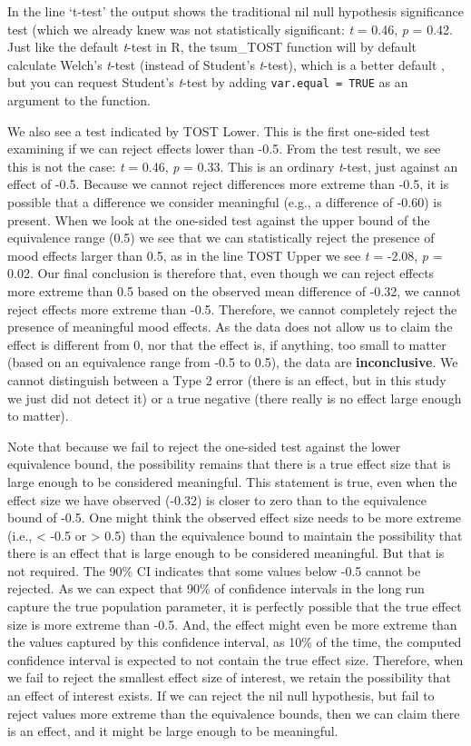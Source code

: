 \documentclass[
  oneside]{krantz}
\begin{document}
In the line `t-test' the output shows the traditional nil null hypothesis significance test (which we already knew was not statistically significant: \emph{t} = 0.46, \emph{p} = 0.42. Just like the default \emph{t}-test in R, the tsum\_TOST function will by default calculate Welch's \emph{t}-test (instead of Student's \emph{t}-test), which is a better default \citep{delacre_why_2017}, but you can request Student's \emph{t}-test by adding \texttt{var.equal\ =\ TRUE} as an argument to the function.

We also see a test indicated by TOST Lower. This is the first one-sided test examining if we can reject effects lower than -0.5. From the test result, we see this is not the case: \emph{t} = 0.46, \emph{p} = 0.33. This is an ordinary \emph{t}-test, just against an effect of -0.5. Because we cannot reject differences more extreme than -0.5, it is possible that a difference we consider meaningful (e.g., a difference of -0.60) is present. When we look at the one-sided test against the upper bound of the equivalence range (0.5) we see that we can statistically reject the presence of mood effects larger than 0.5, as in the line TOST Upper we see \emph{t} = -2.08, \emph{p} = 0.02. Our final conclusion is therefore that, even though we can reject effects more extreme than 0.5 based on the observed mean difference of -0.32, we cannot reject effects more extreme than -0.5. Therefore, we cannot completely reject the presence of meaningful mood effects. As the data does not allow us to claim the effect is different from 0, nor that the effect is, if anything, too small to matter (based on an equivalence range from -0.5 to 0.5), the data are \textbf{inconclusive}. We cannot distinguish between a Type 2 error (there is an effect, but in this study we just did not detect it) or a true negative (there really is no effect large enough to matter).

Note that because we fail to reject the one-sided test against the lower equivalence bound, the possibility remains that there is a true effect size that is large enough to be considered meaningful. This statement is true, even when the effect size we have observed (-0.32) is closer to zero than to the equivalence bound of -0.5. One might think the observed effect size needs to be more extreme (i.e., \textless{} -0.5 or \textgreater{} 0.5) than the equivalence bound to maintain the possibility that there is an effect that is large enough to be considered meaningful. But that is not required. The 90\% CI indicates that some values below -0.5 cannot be rejected. As we can expect that 90\% of confidence intervals in the long run capture the true population parameter, it is perfectly possible that the true effect size is more extreme than -0.5. And, the effect might even be more extreme than the values captured by this confidence interval, as 10\% of the time, the computed confidence interval is expected to not contain the true effect size. Therefore, when we fail to reject the smallest effect size of interest, we retain the possibility that an effect of interest exists. If we can reject the nil null hypothesis, but fail to reject values more extreme than the equivalence bounds, then we can claim there is an effect, and it might be large enough to be meaningful.
\end{document}
